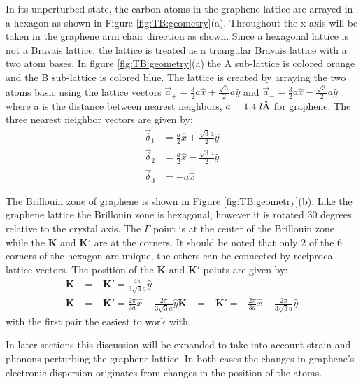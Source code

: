 In its unperturbed state, the carbon atoms in the graphene lattice are arrayed in a hexagon as shown in Figure \ref{fig:TB:geometry}(a).  Throughout the x axis will be taken in the graphene arm chair direction as shown.  Since a hexagonal lattice is not a Bravais lattice, the lattice is treated as a triangular Bravais lattice with a two atom bases.  In figure \ref{fig:TB:geometry}(a) the A sub-lattice is colored orange and the B sub-lattice is colored blue.  The lattice is created by arraying the two atoms basic using the lattice vectors $\vec{a}_+=\frac{3}{2} a \hat{x}+\frac{\sqrt{3}}{2} a \hat{y}$ and $\vec{a}_-=\frac{3}{2} a \hat{x}-\frac{\sqrt{3}}{2} a \hat{y}$ where a is the distance between nearest neighbors, $a=1.4 \ l\textup{\AA}$ for graphene.  The three nearest neighbor vectors are given by:
\begin{align*}
	\vec \delta_1&=\frac{a}{2}\hat{x}+\frac{\sqrt{3} a}{2}\hat{y}\\
	\vec \delta_2&=\frac{a}{2}\hat{x}-\frac{\sqrt{3} a}{2}\hat{y}\\
	\vec \delta_3&=-a \hat{x}
\end{align*}

The Brillouin zone of graphene is shown in Figure \ref{fig:TB:geometry}(b).  Like the graphene lattice the Brillouin zone is hexagonal, however it is rotated 30 degrees relative to the crystal axis. The $\Gamma$ point is at the center of the Brillouin zone while the $\bm{K}$ and $\bm{K'}$ are at the corners.  It should be noted that only 2 of the 6 corners of the hexagon are unique, the others can be connected by reciprocal lattice vectors.  The position of the $\bm{K}$ and $\bm{K'}$ points are given by:
\begin{align*}
	\bm{K}&=-\bm{K'}=\frac{4 \pi}{3 \sqrt{3} a} \hat{y} \\
	\bm{K}&=-\bm{K'}= \frac{2 \pi}{3 a} \hat{x}-\frac{2 \pi}{3 \sqrt{3} a} \hat{y}
	\bm{K}&=-\bm{K'}=-\frac{2 \pi}{3 a} \hat{x}-\frac{2 \pi}{3 \sqrt{3} a} \hat{y}
\end{align*}
with the first pair the easiest to work with.

In later sections this discussion will be expanded to take into account strain and phonons perturbing the graphene lattice.  In both cases the changes in graphene's electronic dispersion originates from changes in the position of the atoms.

